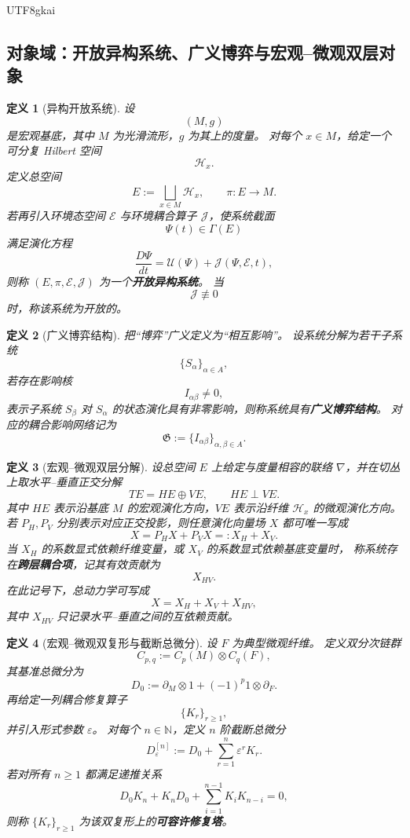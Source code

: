\documentclass[12pt]{article}
\newtheorem{definition}{定义}[section]
\newcommand{\NN}{\mathbb{N}}
\begin{document}
\begin{CJK*}{UTF8}{gkai}
\subsection{对象域：开放异构系统、广义博弈与宏观--微观双层对象}
\label{subsec:tex43-objects}

\begin{definition}[异构开放系统]
\label{def:tex43-open-heterogeneous-system}
设
\[
  (M,g)
\]
是宏观基底，其中 $M$ 为光滑流形，$g$ 为其上的度量。
对每个 $x\in M$，给定一个可分复 Hilbert 空间
\[
  \mathcal H_x .
\]
定义总空间
\[
  E:=\bigsqcup_{x\in M}\mathcal H_x,
  \qquad
  \pi:E\to M.
\]
若再引入环境态空间 $\mathcal E$ 与环境耦合算子 $\mathcal J$，使系统截面
\[
  \Psi(t)\in \Gamma(E)
\]
满足演化方程
\[
  \frac{D\Psi}{dt}
  =
  \mathcal U(\Psi)
  +
  \mathcal J(\Psi,\mathcal E,t),
\]
则称 $(E,\pi,\mathcal E,\mathcal J)$ 为一个\textbf{开放异构系统}。
当
\[
  \mathcal J\not\equiv 0
\]
时，称该系统为开放的。
\end{definition}

\begin{definition}[广义博弈结构]
\label{def:tex43-generalized-game}
把“博弈”广义定义为“相互影响”。
设系统分解为若干子系统
\[
  \{S_\alpha\}_{\alpha\in A},
\]
若存在影响核
\[
  I_{\alpha\beta}\neq 0,
\]
表示子系统 $S_\beta$ 对 $S_\alpha$ 的状态演化具有非零影响，则称系统具有\textbf{广义博弈结构}。
对应的耦合影响网络记为
\[
  \mathfrak G:=\{I_{\alpha\beta}\}_{\alpha,\beta\in A}.
\]
\end{definition}

\begin{definition}[宏观--微观双层分解]
\label{def:tex43-horizontal-vertical}
设总空间 $E$ 上给定与度量相容的联络 $\nabla$，并在切丛上取水平--垂直正交分解
\[
  TE = HE \oplus VE,
  \qquad
  HE\perp VE.
\]
其中 $HE$ 表示沿基底 $M$ 的宏观演化方向，$VE$ 表示沿纤维 $\mathcal H_x$ 的微观演化方向。
若 $P_H,P_V$ 分别表示对应正交投影，则任意演化向量场 $X$ 都可唯一写成
\[
  X=P_HX+P_VX=:X_H+X_V.
\]
当 $X_H$ 的系数显式依赖纤维变量，或 $X_V$ 的系数显式依赖基底变量时，
称系统存在\textbf{跨层耦合项}，记其有效贡献为
\[
  X_{HV}.
\]
在此记号下，总动力学可写成
\[
  X = X_H + X_V + X_{HV},
\]
其中 $X_{HV}$ 只记录水平--垂直之间的互依赖贡献。
\end{definition}

\begin{definition}[宏观--微观双复形与截断总微分]
\label{def:tex43-double-complex}
设 $F$ 为典型微观纤维。
定义双分次链群
\[
  C_{p,q}:=C_p(M)\otimes C_q(F),
\]
其基准总微分为
\[
  D_0
  :=
  \partial_M\otimes 1
  +
  (-1)^p 1\otimes \partial_F .
\]
再给定一列耦合修复算子
\[
  \{K_r\}_{r\ge 1},
\]
并引入形式参数 $\varepsilon$。
对每个 $n\in\NN$，定义 $n$ 阶截断总微分
\[
  D_{\varepsilon}^{[n]}
  :=
  D_0+\sum_{r=1}^{n}\varepsilon^r K_r.
\]
若对所有 $n\ge 1$ 都满足递推关系
\[
  D_0K_n
  +
  K_nD_0
  +
  \sum_{i=1}^{n-1}K_iK_{n-i}
  =0,
\]
则称 $\{K_r\}_{r\ge 1}$ 为该双复形上的\textbf{可容许修复塔}。
\end{definition}


\end{CJK*}
\end{document}

